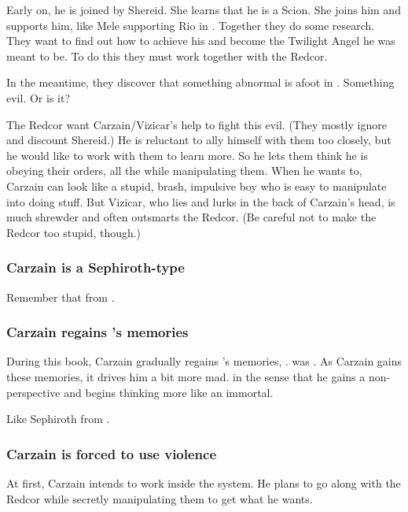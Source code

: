 Early on, he is joined by Shereid. 
She learns that he is a Scion. 
She joins him and supports him, like Mele supporting Rio in \cite{Tokusatsu:Gekiranger}. 
Together they do some research. 
They want to find out how to achieve his \Apotheosis{} and become the Twilight Angel he was meant to be. 
To do this they must work together with the Redcor. 

In the meantime, they discover that something abnormal is afoot in \Redce.
Something evil. 
Or is it? 

The Redcor want Carzain/Vizicar's help to fight this evil. 
(They mostly ignore and discount Shereid.) 
He is reluctant to ally himself with them too closely, but he would like to work with them to learn more. 
So he lets them think he is obeying their orders, all the while manipulating them. 
When he wants to, Carzain can look like a stupid, brash, impulsive boy who is easy to manipulate into doing stuff. 
But Vizicar, who lies and lurks in the back of Carzain's head, is much shrewder and often outsmarts the Redcor. 
(Be careful not to make the Redcor too stupid, though.)





\subsubsection{Carzain is a Sephiroth-type}
Remember that  from \cite{VideoGame:FinalFantasyVII}. 





\subsubsection{Carzain regains \Tydesmos's memories}
During this book, Carzain gradually regains \Tydesmos's memories, . 
\Tydesmos was .
As Carzain gains these memories, it drives him a bit more mad. 
 in the sense that he gains a non-\human perspective and begins thinking more like an immortal. 

Like Sephiroth from \cite{VideoGame:FinalFantasyVII}. 





\subsubsection{Carzain is forced to use violence}
At first, Carzain intends to work inside the system.
He plans to go along with the Redcor while secretly manipulating them to get what he wants. 

